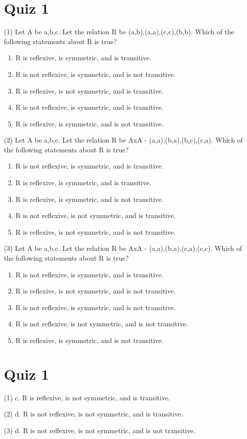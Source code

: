 \documentclass[12pt]{article}
\begin{document}
\section{Quiz 1}


(1) Let A be {a,b,c}. Let the relation R be {(a,b),(a,a),(c,c),(b,b)}. Which of the following statements about R is true?

\begin{enumerate}
\renewcommand{\theenumi}{\alph{enumi}}
\item R is reflexive, is symmetric, and is transitive. 
\item R is not reflexive, is symmetric, and is not transitive. 
\item R is reflexive, is not symmetric, and is transitive. 
\item R is not reflexive, is symmetric, and is transitive. 
\item R is reflexive, is symmetric, and is not transitive. 
\end{enumerate}



(2) Let A be {a,b,c}. Let the relation R be AxA - {(a,a),(b,a),(b,c),(c,a)}. Which of the following statements about R is true?

\begin{enumerate}
\renewcommand{\theenumi}{\alph{enumi}}
\item R is not reflexive, is symmetric, and is transitive. 
\item R is reflexive, is symmetric, and is transitive. 
\item R is reflexive, is symmetric, and is not transitive. 
\item R is not reflexive, is not symmetric, and is transitive. 
\item R is reflexive, is not symmetric, and is not transitive. 
\end{enumerate}



(3) Let A be {a,b,c}. Let the relation R be AxA - {(a,a),(b,a),(c,a),(c,c)}. Which of the following statements about R is true?

\begin{enumerate}
\renewcommand{\theenumi}{\alph{enumi}}
\item R is not reflexive, is symmetric, and is transitive. 
\item R is reflexive, is not symmetric, and is not transitive. 
\item R is not reflexive, is symmetric, and is not transitive. 
\item R is not reflexive, is not symmetric, and is not transitive. 
\item R is reflexive, is symmetric, and is not transitive. 
\end{enumerate}

\section{Quiz 1}


 (1) c. R is reflexive, is not symmetric, and is transitive.



 (2) d. R is not reflexive, is not symmetric, and is transitive.



 (3) d. R is not reflexive, is not symmetric, and is not transitive.
\end{document}
